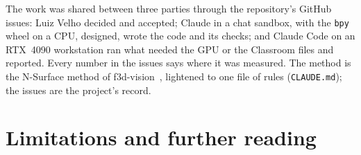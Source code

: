 \documentclass[11pt,a4paper]{article}
\newcommand{\code}[1]{\texttt{\small #1}}
\begin{document}
The work was shared between three parties through the repository's GitHub issues: Luiz Velho decided and
accepted; Claude in a chat sandbox, with the \code{bpy} wheel on a CPU, designed, wrote the code and its checks;
and Claude Code on an RTX~4090 workstation ran what needed the GPU or the Classroom files and reported. Every
number in the issues says where it was measured. The method is the N-Surface method of
f3d-vision~\cite{f3d}, lightened to one file of rules (\code{CLAUDE.md}); the issues are the project's record.

\pagebreak

\section{Limitations and further reading}\label{sec:limits}
\end{document}
